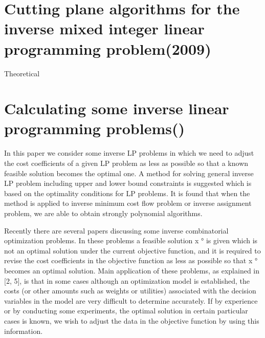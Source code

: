 \documentclass[UTF8]{article}
\begin{document}
\section{Cutting plane algorithms for the inverse mixed integer linear programming problem(2009)}

Theoretical


\section{Calculating some inverse linear programming problems()}

In this paper we consider some inverse LP problems in which we need to adjust the cost coefficients of a given LP problem as less as possible so that a known feasible solution becomes the optimal one. A method for solving general inverse LP problem including upper and lower bound constraints is suggested which is based on the optimality conditions for LP problems. It is found that when the method is applied to inverse minimum cost flow problem or inverse assignment problem, we are able to obtain strongly polynomial algorithms.

Recently there are several papers discussing some inverse combinatorial optimization problems. In these problems a feasible solution x ° is given which is not an optimal solution under the current objective function, and it is required to revise the cost coefficients in the objective function as less as possible so that x ° becomes an optimal solution. Main application of these problems, as explained in [2, 5], is that in some cases although an optimization model is established, the costs (or other amounts such as weights or utilities) associated with the decision variables in the model are very difficult to determine accurately. If by experience or by conducting some experiments, the optimal solution in certain particular cases is known, we wish to adjust the data in the objective function by using this information.
\end{document}

